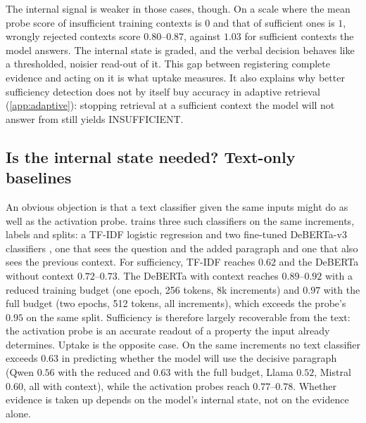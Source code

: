 The internal signal is weaker in those cases, though. On a scale where the mean probe score of insufficient training contexts is $0$ and that of sufficient ones is $1$, wrongly rejected contexts score $0.80$--$0.87$, against $1.03$ for sufficient contexts the model answers. The internal state is graded, and the verbal decision behaves like a thresholded, noisier read-out of it. This gap between registering complete evidence and acting on it is what uptake measures. It also explains why better sufficiency detection does not by itself buy accuracy in adaptive retrieval (\cref{app:adaptive}): stopping retrieval at a sufficient context the model will not answer from still yields INSUFFICIENT.

\subsection{Is the internal state needed? Text-only baselines}
\label{sec:text}
An obvious objection is that a text classifier given the same inputs might do as well as the activation probe.  trains three such classifiers on the same increments, labels and splits: a TF-IDF logistic regression and two fine-tuned DeBERTa-v3 classifiers \cite{he2023debertav3}, one that sees the question and the added paragraph and one that also sees the previous context. For sufficiency, TF-IDF reaches $0.62$ and the DeBERTa without context $0.72$--$0.73$. The DeBERTa with context reaches $0.89$--$0.92$ with a reduced training budget (one epoch, 256 tokens, 8k increments) and $0.97$ with the full budget (two epochs, 512 tokens, all increments), which exceeds the probe's $0.95$ on the same split. Sufficiency is therefore largely recoverable from the text: the activation probe is an accurate readout of a property the input already determines. Uptake is the opposite case. On the same increments no text classifier exceeds $0.63$ in predicting whether the model will use the decisive paragraph (Qwen $0.56$ with the reduced and $0.63$ with the full budget, Llama $0.52$, Mistral $0.60$, all with context), while the activation probes reach $0.77$--$0.78$. Whether evidence is taken up depends on the model's internal state, not on the evidence alone.

\begin{table}[t]
\centering\small

\caption{Text-only classifiers trained on the same increments and splits as the activation probe (document split). ``q+added'': the classifier sees the question and the added paragraph; ``+context'': it also sees the previous context.}
\label{tab:text}
\end{table}
